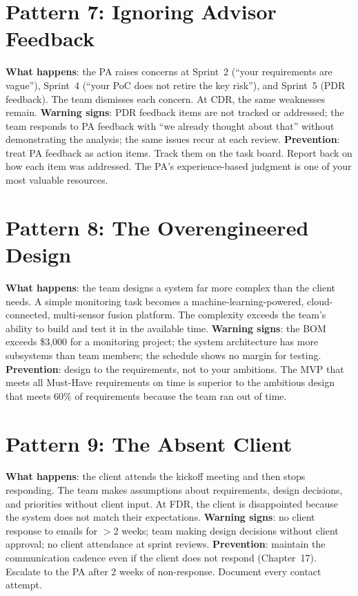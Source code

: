 \section*{Pattern 7: Ignoring Advisor Feedback}
\textbf{What happens}: the PA raises concerns at Sprint~2 (``your requirements are vague''), Sprint~4 (``your PoC does not retire the key risk''), and Sprint~5 (PDR feedback). The team dismisses each concern. At CDR, the same weaknesses remain.
\textbf{Warning signs}: PDR feedback items are not tracked or addressed; the team responds to PA feedback with ``we already thought about that'' without demonstrating the analysis; the same issues recur at each review.
\textbf{Prevention}: treat PA feedback as action items. Track them on the task board. Report back on how each item was addressed. The PA's experience-based judgment is one of your most valuable resources.

\section*{Pattern 8: The Overengineered Design}
\textbf{What happens}: the team designs a system far more complex than the client needs. A simple monitoring task becomes a machine-learning-powered, cloud-connected, multi-sensor fusion platform. The complexity exceeds the team's ability to build and test it in the available time.
\textbf{Warning signs}: the BOM exceeds \$3,000 for a monitoring project; the system architecture has more subsystems than team members; the schedule shows no margin for testing.
\textbf{Prevention}: design to the requirements, not to your ambitions. The MVP that meets all Must-Have requirements on time is superior to the ambitious design that meets 60\% of requirements because the team ran out of time.

\section*{Pattern 9: The Absent Client}
\textbf{What happens}: the client attends the kickoff meeting and then stops responding. The team makes assumptions about requirements, design decisions, and priorities without client input. At FDR, the client is disappointed because the system does not match their expectations.
\textbf{Warning signs}: no client response to emails for $>$2 weeks; team making design decisions without client approval; no client attendance at sprint reviews.
\textbf{Prevention}: maintain the communication cadence even if the client does not respond (Chapter~17). Escalate to the PA after 2 weeks of non-response. Document every contact attempt.

